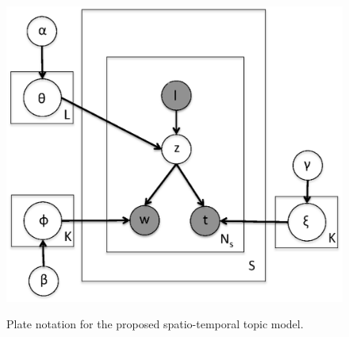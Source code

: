 \documentclass[conference]{IEEEtran}
\begin{document}
\begin{figure}[h]
\begin{center}
       \includegraphics[trim = 30mm 35mm 70mm 25mm, clip, scale=0.4]{fig/stm_model.eps} \label{fig:stm_model}
\end{center}
\caption{Plate notation for the proposed spatio-temporal topic model.}
\label{fig:stm_model}
\end{figure}
\end{document}
